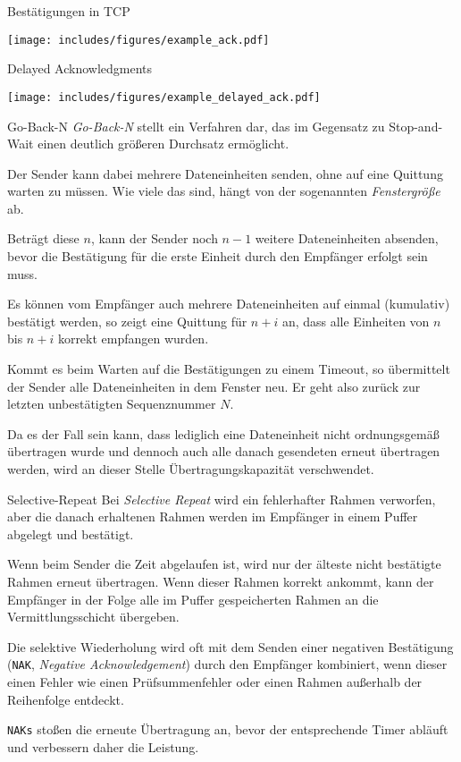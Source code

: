 \begin{example}{Bestätigungen in TCP}
    \begin{center}
        \texttt{[image: includes/figures/example\_ack.pdf]}
    \end{center}
\end{example}

\begin{example}{Delayed Acknowledgments}
    \begin{center}
        \texttt{[image: includes/figures/example\_delayed\_ack.pdf]}
    \end{center}
\end{example}

\begin{bonus}{Go-Back-N}
    \emph{Go-Back-N} stellt ein Verfahren dar, das im Gegensatz zu Stop-and-Wait einen deutlich größeren Durchsatz ermöglicht.

    Der Sender kann dabei mehrere Dateneinheiten senden, ohne auf eine Quittung warten zu müssen.
    Wie viele das sind, hängt von der sogenannten \emph{Fenstergröße} ab.

    Beträgt diese $n$, kann der Sender noch $n-1$ weitere Dateneinheiten absenden, bevor die Bestätigung für die erste Einheit durch den Empfänger erfolgt sein muss.

    Es können vom Empfänger auch mehrere Dateneinheiten auf einmal (kumulativ) bestätigt werden, so zeigt eine Quittung für $n+i$ an, dass alle Einheiten von $n$ bis $n+i$ korrekt empfangen wurden.

    Kommt es beim Warten auf die Bestätigungen zu einem Timeout, so übermittelt der Sender alle Dateneinheiten in dem Fenster neu.
    Er geht also zurück zur letzten unbestätigten Sequenznummer $N$.

    Da es der Fall sein kann, dass lediglich eine Dateneinheit nicht ordnungsgemäß übertragen wurde und dennoch auch alle danach gesendeten erneut übertragen werden, wird an dieser Stelle Übertragungskapazität verschwendet.
\end{bonus}

\begin{bonus}{Selective-Repeat}
    Bei \emph{Selective Repeat}  wird ein fehlerhafter Rahmen verworfen, aber die danach erhaltenen Rahmen werden im Empfänger in einem Puffer abgelegt und bestätigt.

    Wenn beim Sender die Zeit abgelaufen ist, wird nur der älteste nicht bestätigte Rahmen erneut übertragen.
    Wenn dieser Rahmen korrekt ankommt, kann der Empfänger in der Folge alle im Puffer gespeicherten Rahmen an die Vermittlungsschicht übergeben.

    Die selektive Wiederholung wird oft mit dem Senden einer negativen Bestätigung (\texttt{NAK}, \emph{Negative Acknowledgement}) durch den Empfänger kombiniert, wenn dieser einen Fehler wie einen Prüfsummenfehler oder einen Rahmen außerhalb der Reihenfolge entdeckt.

    \texttt{NAKs} stoßen die erneute Übertragung an, bevor der entsprechende Timer abläuft und verbessern daher die Leistung.
\end{bonus}

